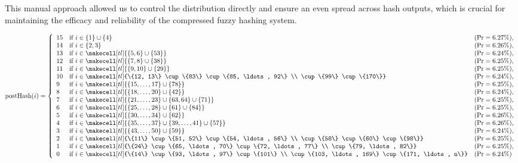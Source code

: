 This manual approach allowed us to control the distribution directly and ensure an even spread across hash outputs, which is crucial for maintaining the efficacy and reliability of the compressed fuzzy hashing system.

\renewcommand{\arraystretch}{1.25}{
\[
\text{postHash}(i) = \left\{
\begin{array}{lll}
    15 & \text{if } i \in \{1\} \cup \{4\} & (\text{Pr} = 6.27\%), \\
    14 & \text{if } i \in \{2, 3\} & (\text{Pr} = 6.26\%), \\
    13 & \text{if } i \in \makecell[tl]{\{5, 6\} \cup \{53\}} & (\text{Pr} = 6.24\%), \\
    12 & \text{if } i \in \makecell[tl]{\{7, 8\} \cup \{38\}} & (\text{Pr} = 6.25\%), \\
    11 & \text{if } i \in \makecell[tl]{\{9, 10\} \cup \{29\}} & (\text{Pr} = 6.25\%), \\
    10 & \text{if } i \in \makecell[tl]{\{12, 13\} \cup \{83\} \cup \{85, \ldots, 92\} \\ \cup \{99\} \cup \{170\}} & (\text{Pr} = 6.24\%), \\
    9  & \text{if } i \in \makecell[tl]{\{15, \ldots, 17\} \cup \{78\}} & (\text{Pr} = 6.25\%), \\
    8  & \text{if } i \in \makecell[tl]{\{18, \ldots, 20\} \cup \{42\}} & (\text{Pr} = 6.24\%), \\
    7  & \text{if } i \in \makecell[tl]{\{21, \ldots, 23\} \cup \{63, 64\} \cup \{71\}} & (\text{Pr} = 6.25\%), \\
    6  & \text{if } i \in \makecell[tl]{\{25, \ldots, 28\} \cup \{61\} \cup \{84\}} & (\text{Pr} = 6.25\%), \\
    5  & \text{if } i \in \makecell[tl]{\{30, \ldots, 34\} \cup \{62\}} & (\text{Pr} = 6.26\%), \\
    4  & \text{if } i \in \makecell[tl]{\{35, \ldots, 37\} \cup \{39, \ldots, 41\} \cup \{57\}} & (\text{Pr} = 6.26\%), \\
    3  & \text{if } i \in \makecell[tl]{\{43, \ldots, 50\} \cup \{59\}} & (\text{Pr} = 6.24\%), \\
    2  & \text{if } i \in \makecell[tl]{\{11\} \cup \{51, 52\} \cup \{54, \ldots, 56\} \\ \cup \{58\} \cup \{60\} \cup \{98\}} & (\text{Pr} = 6.25\%), \\
    1  & \text{if } i \in \makecell[tl]{\{24\} \cup \{65, \ldots, 70\} \cup \{72, \ldots, 77\} \\ \cup \{79, \ldots, 82\}} & (\text{Pr} = 6.25\%), \\
    0  & \text{if } i \in \makecell[tl]{\{14\} \cup \{93, \ldots, 97\} \cup \{101\} \\ \cup \{103, \ldots, 169\} \cup \{171, \ldots, n\}} & (\text{Pr} = 6.24\%)
\end{array}
\right.
\]
}


